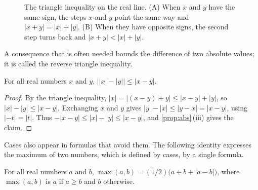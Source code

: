 \begin{figure}
\hfill
{}
\caption{The triangle inequality on the real line. (A) When $x$ and $y$ have the same sign, the steps $x$ and $y$ point the same way and $|x+y|=|x|+|y|$. (B) When they have opposite signs, the second step turns back and $|x+y|<|x|+|y|$.}
\label{fig:triangle}
\end{figure}

A consequence that is often needed bounds the difference of two absolute values; it is called the reverse triangle inequality.

\begin{corollary}
\label{cor:reverse-triangle}
For all real numbers $x$ and $y$, $\bigl||x|-|y|\bigr|\le|x-y|$.
\end{corollary}

\begin{proof}
By the triangle inequality, $|x|=|(x-y)+y|\le|x-y|+|y|$, so $|x|-|y|\le|x-y|$. Exchanging $x$ and $y$ gives $|y|-|x|\le|y-x|=|x-y|$, using $|-t|=|t|$. Thus $-|x-y|\le|x|-|y|\le|x-y|$, and \cref{prop:abs}\,(iii) gives the claim.
\end{proof}

Cases also appear in formulas that avoid them. The following identity expresses the maximum of two numbers, which is defined by cases, by a single formula.

\begin{proposition}
\label{prop:max}
For all real numbers $a$ and $b$, $\max(a,b)=(1/2)\bigl(a+b+|a-b|\bigr)$, where $\max(a,b)$ is $a$ if $a\ge b$ and $b$ otherwise.
\end{proposition}

